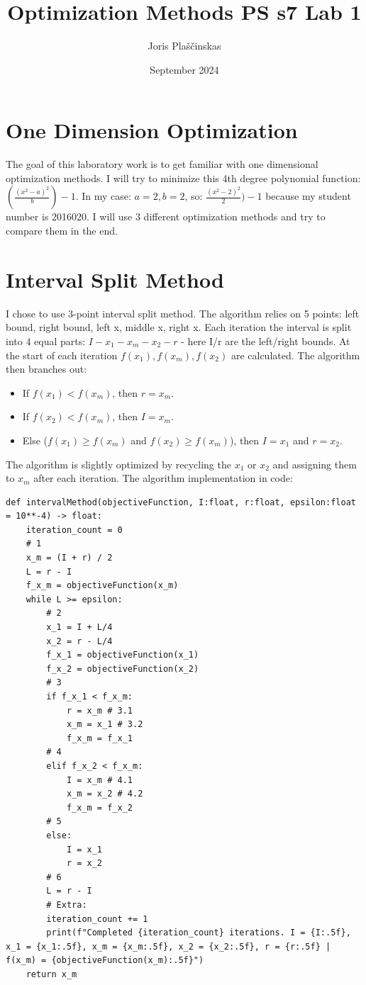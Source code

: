\documentclass{article}
\title{Optimization Methods PS s7 Lab 1}
\author{Joris Plaščinskas}
\date{September 2024}
\begin{document}
    \maketitle
    \section{One Dimension Optimization}
        The goal of this laboratory work is to get familiar with one dimensional optimization methods. I will try to minimize this 4th degree polynomial function: $(\frac{(x^{2} - a)^{2}}{b}) - 1$. In my case: $a=2,b=2$, so: $\frac{(x^{2} - 2)^{2}}{2}) - 1$ because my student number is 2016020. I will use 3 different optimization methods and try to compare them in the end.
    \section{Interval Split Method}
        I chose to use 3-point interval split method. The algorithm relies on 5 points: left bound, right bound, left x, middle x, right x. Each iteration the interval is split into 4 equal parts: $I-x_1-x_m-x_2-r$ - here I/r are the left/right bounds. At the start of each iteration $f(x_1), f(x_m), f(x_2)$ are calculated. The algorithm then branches out:
        \begin{itemize}
            \item If $f(x_1) < f(x_m)$, then $r=x_m$.
            \item If $f(x_2) < f(x_m)$, then $I=x_m$.
            \item Else ($f(x_1) \geq f(x_m)$ and $f(x_2) \geq f(x_m)$), then $I=x_1$ and $r=x_2$.
        \end{itemize}
        The algorithm is slightly optimized by recycling the $x_1$ or $x_2$ and assigning them to $x_m$ after each iteration. The algorithm implementation in code:
        \begin{verbatim}
def intervalMethod(objectiveFunction, I:float, r:float, epsilon:float = 10**-4) -> float:
    iteration_count = 0
    # 1
    x_m = (I + r) / 2
    L = r - I
    f_x_m = objectiveFunction(x_m)
    while L >= epsilon:
        # 2
        x_1 = I + L/4
        x_2 = r - L/4
        f_x_1 = objectiveFunction(x_1)
        f_x_2 = objectiveFunction(x_2)
        # 3
        if f_x_1 < f_x_m:
            r = x_m # 3.1
            x_m = x_1 # 3.2
            f_x_m = f_x_1
        # 4
        elif f_x_2 < f_x_m:
            I = x_m # 4.1
            x_m = x_2 # 4.2
            f_x_m = f_x_2
        # 5
        else:
            I = x_1
            r = x_2
        # 6
        L = r - I
        # Extra:
        iteration_count += 1
        print(f"Completed {iteration_count} iterations. I = {I:.5f}, x_1 = {x_1:.5f}, x_m = {x_m:.5f}, x_2 = {x_2:.5f}, r = {r:.5f} | f(x_m) = {objectiveFunction(x_m):.5f}")
    return x_m
        \end{verbatim}
\end{document}
